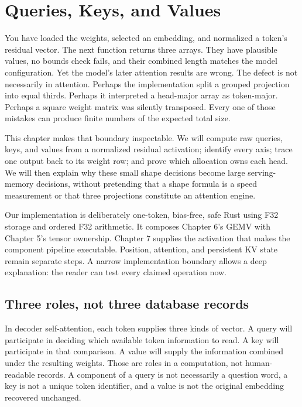 \chapter{Queries, Keys, and Values}\label{chapter-8-queries-keys-and-values}
You have loaded the weights, selected an embedding, and normalized a
token's residual vector. The next function returns three arrays. They
have plausible values, no bounds check fails, and their combined length
matches the model configuration. Yet the model's later attention results
are wrong. The defect is not necessarily in attention. Perhaps the
implementation split a grouped projection into equal thirds. Perhaps it
interpreted a head-major array as token-major. Perhaps a square weight
matrix was silently transposed. Every one of those mistakes can produce
finite numbers of the expected total size.

This chapter makes that boundary inspectable. We will compute raw
queries, keys, and values from a normalized residual activation;
identify every axis; trace one output back to its weight row; and prove
which allocation owns each head. We will then explain why these small
shape decisions become large serving-memory decisions, without
pretending that a shape formula is a speed measurement or that three
projections constitute an attention engine.

Our implementation is deliberately one-token, bias-free, safe Rust using
F32 storage and ordered F32 arithmetic. It composes Chapter 6's GEMV
with Chapter 5's tensor ownership. Chapter 7 supplies the activation
that makes the component pipeline executable. Position, attention, and
persistent KV state remain separate steps. A narrow implementation
boundary allows a deep explanation: the reader can test every claimed
operation now.

\section{Three roles, not three database
records}\label{three-roles-not-three-database-records}


In decoder self-attention, each token supplies three kinds of vector. A
query will participate in deciding which available token information to
read. A key will participate in that comparison. A value will supply the
information combined under the resulting weights. Those are roles in a
computation, not human-readable records. A component of a query is not
necessarily a question word, a key is not a unique token identifier, and
a value is not the original embedding recovered unchanged.

